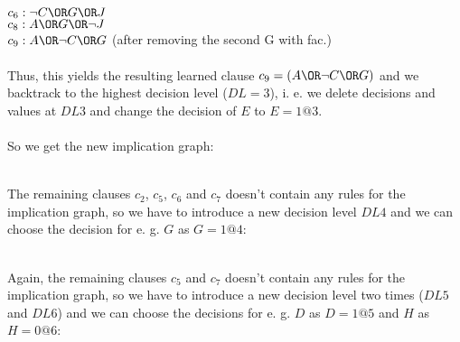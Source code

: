 {$c_6: \neg C \OR G \OR J$\\
\underline{$c_8: A \OR G \OR \neg J$}\\
$c_9: A \OR \neg C \OR G$ (after removing the second G with fac.)\\
\\
Thus, this yields the resulting learned clause $c_9 = (A \OR \neg C \OR G)$
and we backtrack to the highest decision level ($DL = 3$), i. e. we delete decisions
and values at $DL 3$ and change the decision of $E$ to $E = 1@3$.\\
\\
So we get the new implication graph:\\

%
\newline
\\
The remaining clauses $c_2$, $c_5$, $c_6$ and $c_7$ doesn't contain any rules
for the implication graph, so we have to introduce a new decision level $DL 4$
and we can choose the decision for e. g. $G$ as $G = 1@4$:\\
\bigskip

%
\newline
\\
Again, the remaining clauses $c_5$ and $c_7$ doesn't contain any rules
for the implication graph, so we have to introduce a new decision level two
times ($DL 5$ and $DL 6$) and we can choose the decisions for e. g. $D$ as 
$D = 1@5$ and $H$ as $H = 0@6$:\\
\bigskip

}
